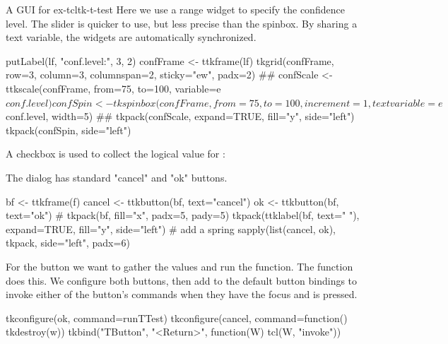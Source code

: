 \begin{example}{A GUI for }{ex-tcltk-t-test}
Here we use a range widget to specify the confidence level. The slider
is quicker to use, but less precise than the spinbox. By sharing a
text variable, the widgets are automatically synchronized.
\begin{Schunk}
\begin{Sinput}
 putLabel(lf, "conf.level:", 3, 2)
 confFrame <- ttkframe(lf)
 tkgrid(confFrame, row=3, column=3, columnspan=2, 
        sticky="ew", padx=2)
 ##
 confScale <- ttkscale(confFrame, from=75, to=100, 
                      variable=e$conf.level)
 confSpin <- tkspinbox(confFrame, from=75, to=100, increment=1, 
                      textvariable=e$conf.level, width=5)
 ##
 tkpack(confScale, expand=TRUE, fill="y", side="left")
 tkpack(confSpin, side="left")
\end{Sinput}
\end{Schunk}

A checkbox is used to collect the logical value for :
\begin{Schunk}
\end{Schunk}


The dialog has standard "cancel" and "ok" buttons.
\begin{Schunk}
\begin{Sinput}
 bf <- ttkframe(f)
 cancel <- ttkbutton(bf, text="cancel")
 ok <- ttkbutton(bf, text="ok")
 #
 tkpack(bf, fill="x", padx=5, pady=5)
 tkpack(ttklabel(bf, text=" "), expand=TRUE, fill="y", 
        side="left")                     # add a spring
 sapply(list(cancel, ok), tkpack, side="left", padx=6)
\end{Sinput}
\end{Schunk}
%

For the  button we want to gather the values and run the
function. The  function does this.  We configure both
buttons, then add to the default button bindings to invoke either of the button's commands
when they have the focus and  is pressed.
\begin{Schunk}
\begin{Sinput}
 tkconfigure(ok, command=runTTest)
 tkconfigure(cancel, command=function() tkdestroy(w))
 tkbind("TButton", "<Return>", function(W) tcl(W, "invoke"))
\end{Sinput}
\end{Schunk}


\end{example}

